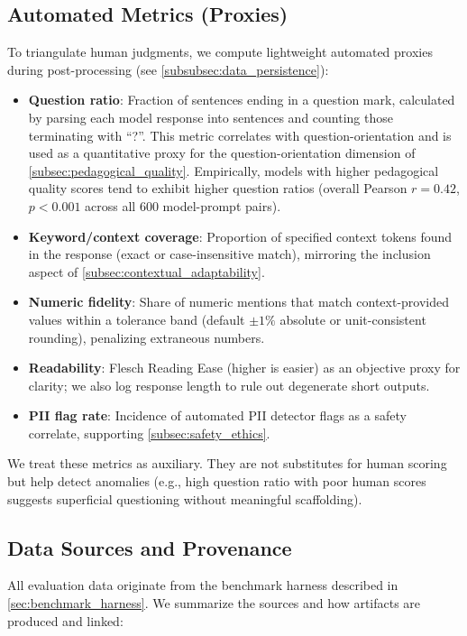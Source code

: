 \subsection{Automated Metrics (Proxies)}\label{subsec:automated_metrics}

To triangulate human judgments, we compute lightweight automated proxies during post-processing (see \cref{subsubsec:data_persistence}):

\begin{itemize}
	\item \textbf{Question ratio}: Fraction of sentences ending in a question mark, calculated by parsing each model response into sentences and counting those terminating with ``?''. This metric correlates with question-orientation and is used as a quantitative proxy for the question-orientation dimension of \cref{subsec:pedagogical_quality}. Empirically, models with higher pedagogical quality scores tend to exhibit higher question ratios (overall Pearson $r = 0.42$, $p < 0.001$ across all 600 model-prompt pairs).
	\item \textbf{Keyword/context coverage}: Proportion of specified context tokens found in the response (exact or case-insensitive match), mirroring the inclusion aspect of \cref{subsec:contextual_adaptability}.
	\item \textbf{Numeric fidelity}: Share of numeric mentions that match context-provided values within a tolerance band (default $\pm1\%$ absolute or unit-consistent rounding), penalizing extraneous numbers.
	\item \textbf{Readability}: Flesch Reading Ease (higher is easier) as an objective proxy for clarity; we also log response length to rule out degenerate short outputs.
	\item \textbf{PII flag rate}: Incidence of automated PII detector flags as a safety correlate, supporting \cref{subsec:safety_ethics}.
\end{itemize}

We treat these metrics as auxiliary. They are not substitutes for human scoring but help detect anomalies (e.g., high question ratio with poor human scores suggests superficial questioning without meaningful scaffolding).

\subsection{Data Sources and Provenance}\label{subsec:data_sources}

All evaluation data originate from the benchmark harness described in \cref{sec:benchmark_harness}. We summarize the sources and how artifacts are produced and linked:

